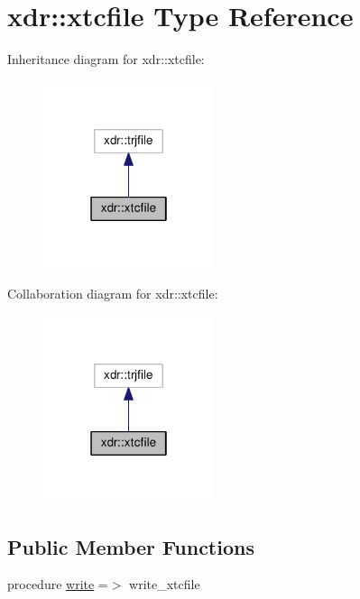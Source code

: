 \hypertarget{structxdr_1_1xtcfile}{}\section{xdr\+:\+:xtcfile Type Reference}
\label{structxdr_1_1xtcfile}


Inheritance diagram for xdr\+:\+:xtcfile\+:\nopagebreak
\begin{figure}[H]
\begin{center}
\leavevmode
\includegraphics[width=142pt]{structxdr_1_1xtcfile__inherit__graph}
\end{center}
\end{figure}


Collaboration diagram for xdr\+:\+:xtcfile\+:\nopagebreak
\begin{figure}[H]
\begin{center}
\leavevmode
\includegraphics[width=142pt]{structxdr_1_1xtcfile__coll__graph}
\end{center}
\end{figure}
\subsection*{Public Member Functions}
\begin{DoxyCompactItemize}
\item 
procedure \hyperlink{structxdr_1_1xtcfile_ac2af78519ced579714c7ffe4f15f5d46}{write} =$>$ write\+\_\+xtcfile
\end{DoxyCompactItemize}
